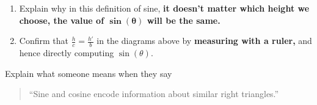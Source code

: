\documentclass[noauthor,nooutcomes,hints,handout]{ximera}
\begin{document}
\begin{question}
\begin{enumerate}
\begin{center}
      \end{center}
      
     \item       
       Explain why in this definition of sine, \textbf{it doesn't matter which
         height we choose, the value of $\boldsymbol{\sin(\theta)}$ will be the same.}

     \item Confirm that $\frac{h}{c} = \frac{h'}{b}$ in the diagrams
       above by \textbf{measuring with a ruler,} and hence directly computing
       $\sin(\theta)$.
        \end{enumerate}
\end{question}

\mynewpage

\begin{question}
  Explain what someone means when they say
  \begin{quote}
    ``Sine and cosine encode information about similar right
    triangles.''
  \end{quote}
\end{question}
\end{document}
